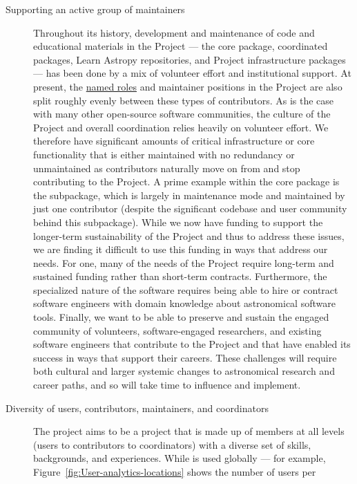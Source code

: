 \documentclass[modern]{aastex631}
\begin{document}
\begin{description}
  \item[Supporting an active group of maintainers] Throughout its history,
  development and maintenance of code and educational materials in the \astropy
  Project --- the \astropypkg core package, coordinated packages, Learn Astropy
  repositories, and Project infrastructure packages --- has been done by a mix
  of volunteer effort and institutional support.
  At present, the \href{https://www.astropy.org/team.html}{named roles} and
  maintainer positions in the \astropy Project are also split roughly evenly
  between these types of contributors.
  As is the case with many other open-source software communities, the culture
  of the Project and overall coordination relies heavily on volunteer effort.
  We therefore have significant amounts of critical infrastructure or core
  functionality that is either maintained with no redundancy or unmaintained as
  contributors naturally move on from and stop contributing to the Project.
  A prime example within the core package is the \astropyfits subpackage, which
  is largely in maintenance mode and maintained by just one contributor (despite
  the significant codebase and user community behind this subpackage).
  While we now have funding to support the longer-term sustainability of the
  Project and thus to address these issues, we are finding it difficult to use
  this funding in ways that address our needs.
  For one, many of the needs of the Project require long-term and sustained
  funding rather than short-term contracts.
  Furthermore, the specialized nature of the software requires being able to hire or
  contract software engineers with domain knowledge about astronomical software
  tools.
  Finally, we want to be able to preserve and sustain the engaged community of
  volunteers, software-engaged researchers, and existing software engineers that
  contribute to the Project and that have enabled its success in ways that
  support their careers.
  These challenges will require both cultural and larger systemic changes to
  astronomical research and career paths, and so will take time to influence and
  implement.
  \item[Diversity of users, contributors, maintainers, and coordinators]
  The \astropy project aims to be a project that is made up of members at all
  levels (users to contributors to coordinators) with a diverse set of skills,
  backgrounds, and experiences.
  While \astropy is used globally --- for example,
  Figure~\ref{fig:User-analytics-locations} shows the number of users per

\end{description}
\end{document}
